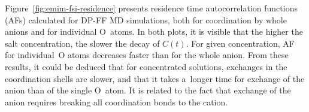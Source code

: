 Figure~\ref{fig:emim-fsi-residence} presents residence time autocorrelation functions (AFs) calculated for DP-FF MD simulations, both for coordination by whole anions and for individual O~atoms. In both plots, it is visible that the higher the salt concentration, the slower the decay of $C(t)$. For given concentration, AF for individual~O atoms decreases faster than for the whole anion. From these results, it could be deduced that for concentrated solutions, exchanges in the coordination shells are slower, and that it takes a~longer time for exchange of the anion than of the single O~atom. It is related to the fact that exchange of the anion requires breaking all coordination bonds to the cation.

\cleardoublepage